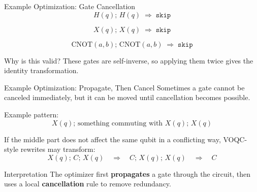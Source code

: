 \documentclass[aspectratio=169]{beamer}
\begin{document}
\begin{frame}{Example Optimization: Gate Cancellation}
\centering
\Large
\[
H(q);\, H(q) \;\Longrightarrow\; \texttt{skip}
\]

\vspace{0.6em}

\[
X(q);\, X(q) \;\Longrightarrow\; \texttt{skip}
\]

\vspace{0.6em}

\[
\mathrm{CNOT}(a,b);\, \mathrm{CNOT}(a,b) \;\Longrightarrow\; \texttt{skip}
\]

\vspace{0.6em}
\normalsize
\begin{block}{Why is this valid?}
These gates are self-inverse, so applying them twice gives the identity transformation.
\end{block}
\end{frame}
\begin{frame}{Example Optimization: Propagate, Then Cancel}
\justifying
Sometimes a gate cannot be canceled immediately, but it can be moved until cancellation becomes possible.

\vspace{0.8em}
Example pattern:
\[
X(q);\, \text{something commuting with }X(q);\, X(q)
\]

If the middle part does not affect the same qubit in a conflicting way, VOQC-style rewrites may transform:
\[
X(q);\, C;\, X(q)
\quad\Longrightarrow\quad
C;\, X(q);\, X(q)
\quad\Longrightarrow\quad
C
\]

\vspace{0.8em}
\begin{block}{Interpretation}
The optimizer first \textbf{propagates} a gate through the circuit, then uses a local
\textbf{cancellation} rule to remove redundancy.
\end{block}
\end{frame}
\end{document}

